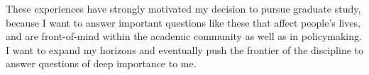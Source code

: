 These experiences have strongly motivated my decision to pursue graduate study, because I want to answer important questions like these that affect people's lives, and are front-of-mind within the academic community as well as in policymaking. I want to expand my horizons and eventually push the frontier of the discipline to answer questions of deep importance to me.

